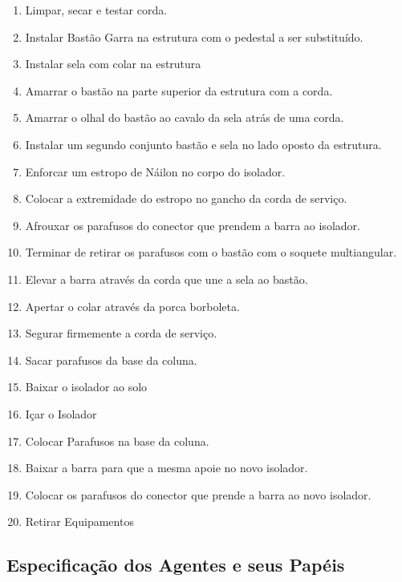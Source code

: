 \begin{enumerate}
	\item Limpar, secar e testar corda.
	\item Instalar Bastão Garra na estrutura com o pedestal a ser substituído.
	\item Instalar sela com colar na estrutura
	\item Amarrar o bastão na parte superior da estrutura com a corda.
	\item Amarrar o olhal do bastão ao cavalo da sela atrás de uma corda.
	\item Instalar um segundo conjunto bastão e sela no lado oposto da estrutura.
	\item Enforcar um estropo de Náilon no corpo do isolador.
	\item Colocar a extremidade do estropo no gancho da corda de serviço.
	\item Afrouxar os parafusos do conector que prendem a barra ao isolador.
	\item Terminar de retirar os parafusos com o bastão com o soquete multiangular.
	\item Elevar a barra através da corda que une a sela ao bastão.
	\item Apertar o colar através da porca borboleta.
	\item Segurar firmemente a corda de serviço.
	\item Sacar parafusos da base da coluna.
	\item Baixar o isolador ao solo
	\item Içar o Isolador
	\item Colocar Parafusos na base da coluna.
	\item Baixar a barra para que a mesma apoie no novo isolador.
	\item Colocar os parafusos do conector que prende a barra ao novo isolador. 
	\item Retirar Equipamentos
\end{enumerate}

\subsection{Especificação dos Agentes e seus Papéis}

